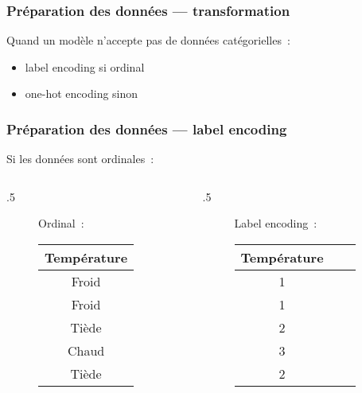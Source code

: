\documentclass{formation}
\begin{document}
\begin{frame}
  \frametitle{Préparation des données — transformation}

  Quand un modèle n'accepte pas de données catégorielles :

  \begin{itemize}
  \item label encoding si ordinal
  \item one-hot encoding sinon
  \end{itemize}
\end{frame}

\begin{frame}
  \frametitle{Préparation des données — label encoding}

  Si les données sont ordinales :
  
  \begin{columns}
    \begin{column}{.5\tw}
      \begin{figure}
        \centering
        Ordinal :\\[.5cm]

        \begin{tabular}{c}
          \toprule
          Température \\
          \midrule
          Froid \\
          Froid \\
          Tiède \\
          Chaud \\
          Tiède \\
          \bottomrule
        \end{tabular}
      \end{figure}
    \end{column}
    \begin{column}{.5\tw}
      \begin{figure}
        \centering
        Label encoding :\\[.5cm]

        \begin{tabular}{ccc}
          \toprule
          Température \\
          \midrule
          1 \\
          1 \\
          2 \\
          3 \\
          2 \\
          \bottomrule
        \end{tabular}
      \end{figure}
    \end{column}
  \end{columns}
\end{frame}
\end{document}
